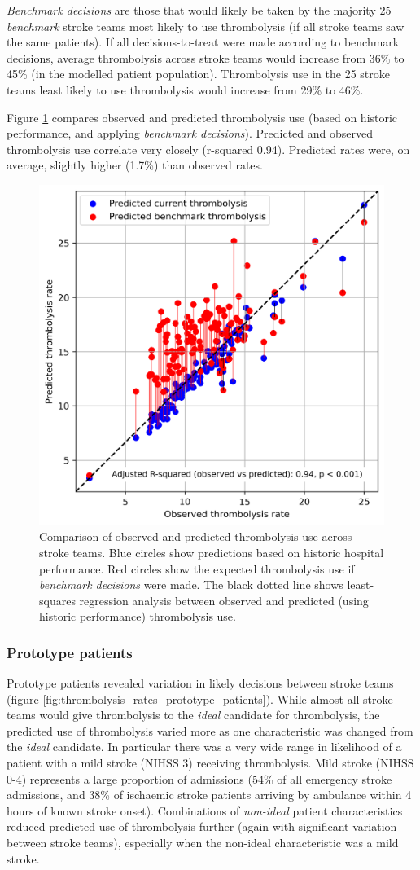\textit{Benchmark decisions} are those that would likely be taken by the majority 25 \textit{benchmark} stroke teams most likely to use thrombolysis (if all stroke teams saw the same patients). If all decisions-to-treat were made according to benchmark decisions, average thrombolysis across stroke teams would increase from 36\% to 45\% (in the modelled patient population). Thrombolysis use in the 25 stroke teams least likely to use thrombolysis would increase from 29\% to 46\%.

Figure \ref{fig:thrombolysis_rates_teams} compares observed and predicted thrombolysis use (based on historic performance, and applying \textit{benchmark decisions}). Predicted and observed thrombolysis use correlate very closely (r-squared 0.94). Predicted rates were, on average, slightly higher (1.7\%) than observed rates.

\begin{figure}[!h]
    \centering
    \includegraphics[width=0.5\linewidth]{images/p5_benchmark_rates.png}
    \caption{Comparison of observed and predicted thrombolysis use across stroke teams. Blue circles show predictions based on historic hospital performance. Red circles show the expected thrombolysis use if \textit{benchmark decisions} were made. The black dotted line shows least-squares regression analysis between observed and predicted (using historic performance) thrombolysis use.}
    \label{fig:thrombolysis_rates_teams}
\end{figure}

\subsubsection{Prototype patients}

Prototype patients revealed variation in likely decisions between stroke teams (figure \ref{fig:thrombolysis_rates_prototype_patients}). While almost all stroke teams would give thrombolysis to the \textit{ideal} candidate for thrombolysis, the predicted use of thrombolysis varied more as one characteristic was changed from the \textit{ideal} candidate. In particular there was a very wide range in likelihood of a patient with a mild stroke (NIHSS 3) receiving thrombolysis. Mild stroke (NIHSS 0-4) represents a large proportion of admissions (54\% of all emergency stroke admissions, and 38\% of ischaemic stroke patients arriving by ambulance within 4 hours of known stroke onset). Combinations of \textit{non-ideal} patient characteristics reduced predicted use of thrombolysis further (again with significant variation between stroke teams), especially when the non-ideal characteristic was a mild stroke.

